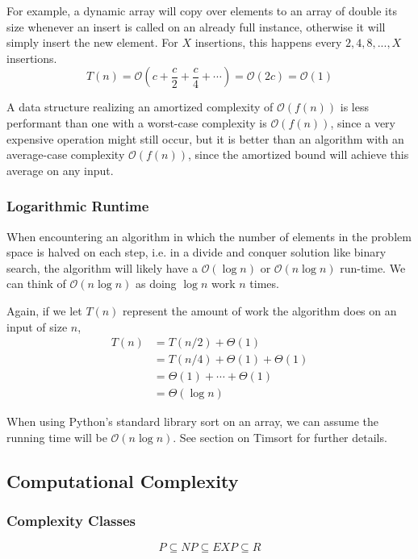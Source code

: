 \documentclass{article}
\newcommand{\bigO}{\mathcal{O}}
\begin{document}
    For example, a dynamic array will copy over elements to an array of double its size whenever an insert is called on an already full instance, otherwise it will simply insert the new element. For $X$ insertions, this happens every $2, 4, 8, ..., X$ insertions.
    \[
        T(n) = \bigO ( c + \frac{c}{2} + \frac{c}{4} + \cdots) 
        = \bigO(2c) 
        = \bigO(1)
    \]
    
    A data structure realizing an amortized complexity of $\bigO (f(n))$ is less performant than one with a worst-case complexity is $\bigO(f(n))$, since a very expensive operation might still occur, but it is better than an algorithm with an average-case complexity $\bigO(f(n))$, since the amortized bound will achieve this average on any input.
    
    \subsubsection{Logarithmic Runtime}
    When encountering an algorithm in which the number of elements in the problem space is halved on each step, i.e. in a divide and conquer solution like binary search, the algorithm will likely have a $\bigO(\log n)$ or $\bigO(n \log n)$ run-time. We can think of $\bigO(n \log n)$ as doing $\log n$ work $n$ times. 
    
    Again, if we let $T(n)$ represent the amount of work the algorithm does on an input of size $n$,
    \begin{align*}
        T(n) &= T(n/2) + \Theta(1) \\
        &=  T(n/4)+ \Theta(1) + \Theta(1) \\ 
        &= \Theta(1) + \cdots + \Theta(1) \\
        &= \Theta(\log n ) 
    \end{align*}
    
    When using Python's standard library sort on an array, we can assume the running time will be $\bigO (n \log n)$. See section on Timsort for further details.
    
    \subsection{Computational Complexity}
    \subsubsection{Complexity Classes}
    \[
        P \subseteq NP \subseteq EXP \subseteq R
    \]
    
\end{document}
